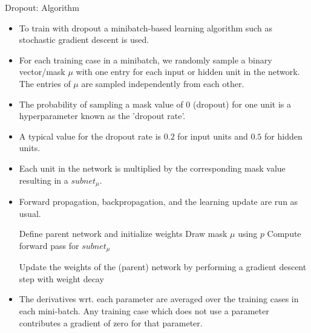 \begin{vbframe}{Dropout: Algorithm}
  \begin{itemize}
    \item To train with dropout a minibatch-based learning algorithm such as stochastic gradient descent is used.  
    \item For each training case in a minibatch, we randomly sample a binary vector/mask $\mu$ with one entry for each input or hidden unit in the network. The entries of $\mu$ are sampled independently from each other. 
    \item The probability of sampling a mask value of 0 (dropout) for one unit is a hyperparameter known as the 'dropout rate'. 
    \item A typical value for the dropout rate is $0.2$ for input units and $0.5$ for hidden units. 
    \item Each unit in the network is multiplied by the corresponding mask value resulting in a $subnet_{\mu}$. 
    \item Forward propagation, backpropagation, and the learning update are run as usual.
  \framebreak
  \begin{algorithm}[H]
  \footnotesize
  \caption{Training a (parent) neural network with dropout rate $p$}
    \begin{algorithmic}[1]
      \State Define parent network and initialize weights
        \State Draw mask $\mu$ using $p$
        \State Compute forward pass for $subnet_{\mu}$
        \EndFor
        \State \parbox[t]{\dimexpr\linewidth-\algorithmicindent}{Update the weights of the (parent) network by performing a gradient descent step with weight decay}
      \EndFor
    \end{algorithmic}
  \end{algorithm}
    \item The derivatives wrt. each parameter are averaged over the training cases in each mini-batch. Any training case which does not use a parameter contributes a gradient of zero for that parameter.
      \end{itemize}
\end{vbframe}

